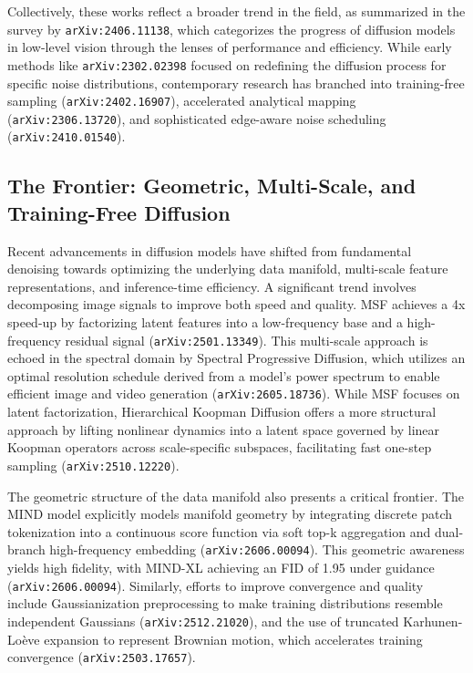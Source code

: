 \documentclass[11pt]{article}
\begin{document}
Collectively, these works reflect a broader trend in the field, as summarized in the survey by \texttt{arXiv:2406.11138}, which categorizes the progress of diffusion models in low-level vision through the lenses of performance and efficiency. While early methods like \texttt{arXiv:2302.02398} focused on redefining the diffusion process for specific noise distributions, contemporary research has branched into training-free sampling (\texttt{arXiv:2402.16907}), accelerated analytical mapping (\texttt{arXiv:2306.13720}), and sophisticated edge-aware noise scheduling (\texttt{arXiv:2410.01540}).

\subsection{The Frontier: Geometric, Multi-Scale, and Training-Free Diffusion}

Recent advancements in diffusion models have shifted from fundamental denoising towards optimizing the underlying data manifold, multi-scale feature representations, and inference-time efficiency. A significant trend involves decomposing image signals to improve both speed and quality. MSF achieves a 4x speed-up by factorizing latent features into a low-frequency base and a high-frequency residual signal (\texttt{arXiv:2501.13349}). This multi-scale approach is echoed in the spectral domain by Spectral Progressive Diffusion, which utilizes an optimal resolution schedule derived from a model's power spectrum to enable efficient image and video generation (\texttt{arXiv:2605.18736}). While MSF focuses on latent factorization, Hierarchical Koopman Diffusion offers a more structural approach by lifting nonlinear dynamics into a latent space governed by linear Koopman operators across scale-specific subspaces, facilitating fast one-step sampling (\texttt{arXiv:2510.12220}).

The geometric structure of the data manifold also presents a critical frontier. The MIND model explicitly models manifold geometry by integrating discrete patch tokenization into a continuous score function via soft top-k aggregation and dual-branch high-frequency embedding (\texttt{arXiv:2606.00094}). This geometric awareness yields high fidelity, with MIND-XL achieving an FID of 1.95 under guidance (\texttt{arXiv:2606.00094}). Similarly, efforts to improve convergence and quality include Gaussianization preprocessing to make training distributions resemble independent Gaussians (\texttt{arXiv:2512.21020}), and the use of truncated Karhunen-Loève expansion to represent Brownian motion, which accelerates training convergence (\texttt{arXiv:2503.17657}).
\end{document}
